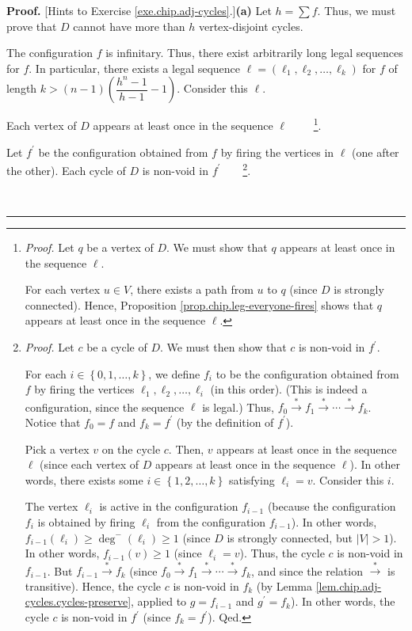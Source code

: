 \documentclass[numbers=enddot,12pt,final,onecolumn,notitlepage]{scrartcl}%
\theoremstyle{definition}
\newenvironment{proof}[1][Proof]{\noindent\textbf{#1.} }{\ \rule{0.5em}{0.5em}}
\let\sumnonlimits\sum
\renewcommand{\sum}{\sumnonlimits\limits}
\begin{document}
\begin{proof}
[Hints to Exercise \ref{exe.chip.adj-cycles}.]\textbf{(a)}
Let $h=\sum f$. Thus, we must prove that $D$ cannot have more than $h$
vertex-disjoint cycles.

The configuration
$f$ is infinitary. Thus, there exist arbitrarily long legal sequences for $f$.
In particular, there exists a legal sequence $\ell=\left(  \ell_{1},\ell
_{2},\ldots,\ell_{k}\right)  $ for $f$ of length $k>\left(  n-1\right)
\left(  \dfrac{h^{n}-1}{h-1}-1\right)  $. Consider this $\ell$.

Each vertex of $D$ appears at least once in the sequence $\ell$%
\ \ \ \ \footnote{\textit{Proof.} Let $q$ be a vertex of $D$. We must show
that $q$ appears at least once in the sequence $\ell$.
\par
For each vertex $u\in V$, there exists a path from $u$ to $q$ (since $D$ is
strongly connected). Hence, Proposition \ref{prop.chip.leg-everyone-fires}
shows that $q$ appears at least once in the sequence $\ell$.}.

Let $f^{\prime}$ be the configuration obtained from $f$ by firing the vertices
in $\ell$ (one after the other). Each cycle of $D$ is non-void in $f^{\prime}%
$\ \ \ \ \footnote{\textit{Proof.} Let $c$ be a cycle of $D$. We must then
show that $c$ is non-void in $f^{\prime}$.
\par
For each $i\in\left\{  0,1,\ldots,k\right\}  $, we define $f_{i}$ to be the
configuration obtained from $f$ by firing the vertices $\ell_{1},\ell
_{2},\ldots,\ell_{i}$ (in this order). (This is indeed a configuration, since
the sequence $\ell$ is legal.) Thus, $f_{0}\overset{\ast}{\rightarrow}%
f_{1}\overset{\ast}{\rightarrow}\cdots\overset{\ast}{\rightarrow}f_{k}$.
Notice that $f_{0}=f$ and $f_{k}=f^{\prime}$ (by the definition of $f^{\prime
}$).
\par
Pick a vertex $v$ on the cycle $c$. Then, $v$ appears at least once in the
sequence $\ell$ (since each vertex of $D$ appears at least once in the
sequence $\ell$). In other words, there exists some $i\in\left\{
1,2,\ldots,k\right\}  $ satisfying $\ell_{i}=v$. Consider this $i$.
\par
The vertex $\ell_{i}$ is active in the configuration $f_{i-1}$ (because the
configuration $f_{i}$ is obtained by firing $\ell_{i}$ from the configuration
$f_{i-1}$). In other words, $f_{i-1}\left(  \ell_{i}\right)  \geq\deg
^{-}\left(  \ell_{i}\right)  \geq1$ (since $D$ is strongly connected, but
$\left\vert V\right\vert >1$). In other words, $f_{i-1}\left(  v\right)
\geq1$ (since $\ell_{i}=v$). Thus, the cycle $c$ is non-void in $f_{i-1}$. But
$f_{i-1}\overset{\ast}{\rightarrow}f_{k}$ (since $f_{0}\overset{\ast
}{\rightarrow}f_{1}\overset{\ast}{\rightarrow}\cdots\overset{\ast
}{\rightarrow}f_{k}$, and since the relation $\overset{\ast}{\rightarrow}$ is
transitive). Hence, the cycle $c$ is non-void in $f_{k}$ (by Lemma
\ref{lem.chip.adj-cycles.cycles-preserve}, applied to $g=f_{i-1}$ and
$g^{\prime}=f_{k}$). In other words, the cycle $c$ is non-void in $f^{\prime}$
(since $f_{k}=f^{\prime}$). Qed.}.


\end{proof}
\end{document}
